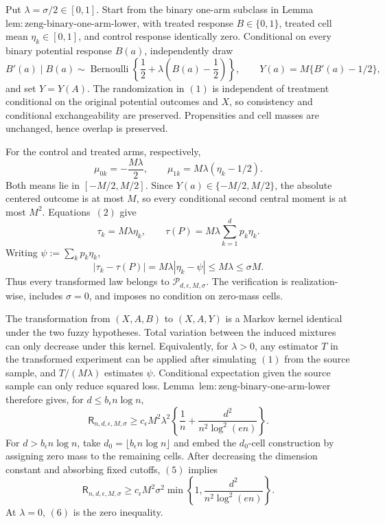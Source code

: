 Put \(\lambda=\sigma/2\in[0,1]\).  Start from the binary one-arm subclass in Lemma~\(\mathrm{lem:zeng\text{-}binary\text{-}one\text{-}arm\text{-}lower}\), with treated response \(B\in\{0,1\}\), treated cell mean \(\eta_k\in[0,1]\), and control response identically zero.  Conditional on every binary potential response \(B(a)\), independently draw
\[
 B'(a)\mid B(a)\sim\operatorname{Bernoulli}\!\left\{\frac12+\lambda\left(B(a)-\frac12\right)\right\},
 \qquad Y(a)=M\{B'(a)-1/2\},
\tag{1}
\]
and set \(Y=Y(A)\).  The randomization in \((1)\) is independent of treatment conditional on the original potential outcomes and \(X\), so consistency and conditional exchangeability are preserved.  Propensities and cell masses are unchanged, hence overlap is preserved.

For the control and treated arms, respectively,
\[
 \mu_{0k}=-\frac{M\lambda}{2},
 \qquad
 \mu_{1k}=M\lambda(\eta_k-1/2).
\tag{2}
\]
Both means lie in \([-M/2,M/2]\).  Since \(Y(a)\in\{-M/2,M/2\}\), the absolute centered outcome is at most \(M\), so every conditional second central moment is at most \(M^2\).  Equations~\((2)\) give
\[
 \tau_k=M\lambda\eta_k,
 \qquad
 \tau(P)=M\lambda\sum_{k=1}^dp_k\eta_k.
\tag{3}
\]
Writing \(\psi:=\sum_kp_k\eta_k\),
\[
 |\tau_k-\tau(P)|=M\lambda|\eta_k-\psi|
 \le M\lambda\le\sigma M.
\tag{4}
\]
Thus every transformed law belongs to \(\mathcal P_{d,\epsilon,M,\sigma}\).  The verification is realization-wise, includes \(\sigma=0\), and imposes no condition on zero-mass cells.

The transformation from \((X,A,B)\) to \((X,A,Y)\) is a Markov kernel identical under the two fuzzy hypotheses.  Total variation between the induced mixtures can only decrease under this kernel.  Equivalently, for \(\lambda>0\), any estimator \(T\) in the transformed experiment can be applied after simulating \((1)\) from the source sample, and \(T/(M\lambda)\) estimates \(\psi\).  Conditional expectation given the source sample can only reduce squared loss.  Lemma~\(\mathrm{lem:zeng\text{-}binary\text{-}one\text{-}arm\text{-}lower}\) therefore gives, for \(d\le b_{\epsilon}n\log n\),
\[
 \mathsf R_{n,d,\epsilon,M,\sigma}
 \ge c_{\epsilon}M^2\lambda^2
 \left\{\frac1n+\frac{d^2}{n^2\log^2(en)}\right\}.
\tag{5}
\]
For \(d>b_{\epsilon}n\log n\), take \(d_0=\lfloor b_{\epsilon}n\log n\rfloor\) and embed the \(d_0\)-cell construction by assigning zero mass to the remaining cells.  After decreasing the dimension constant and absorbing fixed cutoffs, \((5)\) implies
\[
 \mathsf R_{n,d,\epsilon,M,\sigma}
 \ge c_{\epsilon}M^2\sigma^2
 \min\left\{1,\frac{d^2}{n^2\log^2(en)}\right\}.
\tag{6}
\]
At \(\lambda=0\), \((6)\) is the zero inequality.

